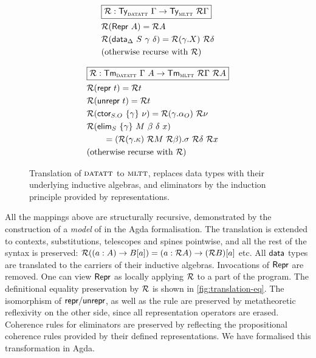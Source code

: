 \begin{figure}
\begin{minipage}[t]{0.5\textwidth}
\begin{align*}
&\boxed{\mathcal{R} : \textsf{Ty}_{{\textsc{datatt}}}\ \Gamma \to \textsf{Ty}_{{\textsc{mltt}}}\ \mathcal{R} \Gamma} \\
&\mathcal{R} (\textsf{Repr}\ A) = \mathcal{R} A \\
&\mathcal{R} (\textsf{data}_{\Delta}\ S\ \gamma\ \delta) = \mathcal{R} (\gamma.X)\ \mathcal{R} \delta \\
&\text{(otherwise recurse with $\mathcal{R}$)}
\end{align*}
\end{minipage}%
\begin{minipage}[t]{0.5\textwidth}
\begin{align*}
&\boxed{\mathcal{R} : \textsf{Tm}_{{\textsc{datatt}}}\ \Gamma\ A \to \textsf{Tm}_{{\textsc{mltt}}}\ \mathcal{R} \Gamma\ \mathcal{R} A} \\
&\mathcal{R} (\textsf{repr}\ t) = \mathcal{R} t \\
&\mathcal{R} (\textsf{unrepr}\ t) = \mathcal{R} t \\
&\mathcal{R} (\textsf{ctor}_{S.O}\ \{\gamma\}\ \nu) = \mathcal{R} (\gamma.\alpha_O)\ \mathcal{R}\nu \\
&\mathcal{R} (\textsf{elim}_{S}\ \{\gamma\}\ M\ \beta\ \delta\ x)  \\ &\qquad = (\mathcal{R} (\gamma.\kappa)\ \mathcal{R} M\ \mathcal{R} \beta).\sigma\ \mathcal{R}\delta\ \mathcal{R} x \\
&\text{(otherwise recurse with $\mathcal{R}$)}
\end{align*}
\end{minipage}
\caption{Translation of ${\textsc{datatt}}$ to ${\textsc{mltt}}$, replaces data types
with their underlying inductive algebras, and eliminators by the induction
principle provided by representations.}
\label{fig:translation}
\end{figure}

All the mappings above are structurally recursive, demonstrated by the construction
of a  \emph{model} of \lambdadata in the Agda formalisation. The translation is
extended to contexts, substitutions, telescopes and spines pointwise, and all
the rest of the syntax is preserved: $\mathcal{R}((a : A) \to B[a]) = (a : \mathcal{R} A) \to (\mathcal{R}
B)[a]$ etc. All $\textsf{data}$ types are translated to the carriers of their inductive
algebras. Invocations of $\textsf{Repr}$ are removed. One can view $\textsf{Repr}$ as locally
applying $\mathcal{R}$ to a part of the program. The definitional equality preservation
by $\mathcal{R}$ is shown in \cref{fig:translation-eq}. The isomorphism of
$\textsf{repr}/\textsf{unrepr}$, as well as the rule \hyperlink{Repr-Data}{} are preserved by
metatheoretic reflexivity on the other side, since all representation operators
are erased. Coherence rules for eliminators are preserved by reflecting the
propositional coherence rules provided by their defined representations. We have
formalised this transformation in Agda.

